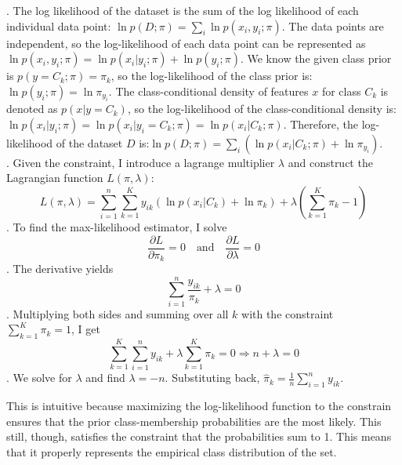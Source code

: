 \documentclass[submit]{harvardml}
\begin{document}
\pagebreak
{}. The log likelihood of the dataset is the sum of the log likelihood of each individual data point: $\ln p(D; \pi) = \sum_{i} \ln p(x_i, y_i; \pi)$. The data points are independent, so the log-likelihood of each data point can be represented as $\ln p(x_i, y_i; \pi) = \ln p(x_i|y_i; \pi) + \ln p(y_i; \pi)$. We know the given class prior is $p(y = C_k; \pi) = \pi_k$, so the log-likelihood of the class prior is: $\ln p(y_i; \pi) = \ln \pi_{y_i}$. The class-conditional density of features \(x\) for class \(C_k\) is denoted as \(p(x|y = C_k)\), so the log-likelihood of the class-conditional density is:$\ln p(x_i|y_i; \pi) = \ln p(x_i|y_i = C_k; \pi) = \ln p(x_i|C_k; \pi)$. Therefore, the log-likelihood of the dataset \(D\) is:$\ln p(D; \pi) = \sum_{i} (\ln p(x_i|C_k; \pi) + \ln \pi_{y_i})$.
\\. Given the constraint, I introduce a lagrange multiplier $\lambda$ and construct the Lagrangian function \(L(\pi, \lambda)\):
\[
L(\pi, \lambda) = \sum_{i=1}^n \sum_{k=1}^K y_{ik} (\ln p(x_i|C_k) + \ln \pi_k) + \lambda \left(\sum_{k=1}^K \pi_k - 1\right)
\]. To find the max-likelihood estimator, I solve \[
\frac{\partial L}{\partial \pi_k} = 0 \quad \text{and} \quad \frac{\partial L}{\partial \lambda} = 0
\]. The derivative yields \[
\sum_{i=1}^n \frac{y_{ik}}{\pi_k} + \lambda = 0
\]. Multiplying both sides and summing over all $k$ with the constraint \(\sum_{k=1}^K \pi_k = 1\), I get \[
\sum_{k=1}^K \sum_{i=1}^n y_{ik} + \lambda \sum_{k=1}^K \pi_k = 0 \Rightarrow n + \lambda = 0
\]. We solve for $\lambda$ and find $\lambda = -n$. Substituting back, $\hat{\pi}_k = \frac{1}{n} \sum_{i=1}^n y_{ik}$. 

This is intuitive because maximizing the log-likelihood function to the constrain ensures that the prior class-membership probabilities are the most likely. This still, though, satisfies the constraint that the probabilities sum to 1. This means that it properly represents the empirical class distribution of the set. 
\end{document}
